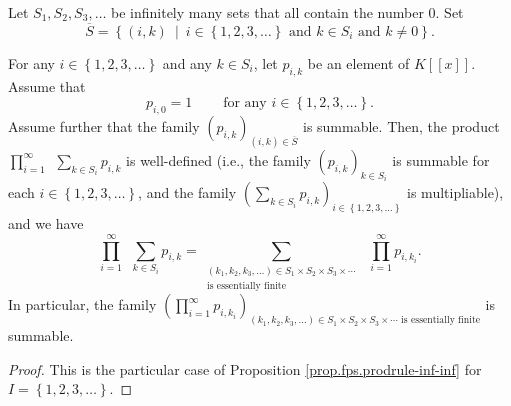 \begin{proposition}
\label{prop.fps.prodrule-inf-infN}
\leantarget
\leanok
Let $S_{1},S_{2},S_{3},\ldots$ be infinitely
many sets that all contain the number $0$. Set%
\[
\overline{S}=\left\{  \left(  i,k\right)  \ \mid\ i\in\left\{  1,2,3,\ldots
\right\}  \text{ and }k\in S_{i}\text{ and }k\neq0\right\}  .
\]

For any $i\in\left\{  1,2,3,\ldots\right\}  $ and any $k\in S_{i}$, let
$p_{i,k}$ be an element of $K\left[  \left[  x\right]  \right]  $. Assume
that
\begin{equation}
p_{i,0}=1\ \ \ \ \ \ \ \ \ \ \text{for any }i\in\left\{  1,2,3,\ldots\right\}
. \label{eq.prop.fps.prodrule-inf-infN.pi0=1}%
\end{equation}
Assume further that the family $\left(  p_{i,k}\right)  _{\left(  i,k\right)
\in\overline{S}}$ is summable. Then, the product $\prod_{i=1}^{\infty}%
\ \ \sum_{k\in S_{i}}p_{i,k}$ is well-defined (i.e., the family $\left(
p_{i,k}\right)  _{k\in S_{i}}$ is summable for each $i\in\left\{
1,2,3,\ldots\right\}  $, and the family $\left(  \sum_{k\in S_{i}}%
p_{i,k}\right)  _{i\in\left\{  1,2,3,\ldots\right\}  }$ is multipliable), and
we have%
\begin{equation}
\prod_{i=1}^{\infty}\ \ \sum_{k\in S_{i}}p_{i,k}=\sum_{\substack{\left(
k_{1},k_{2},k_{3},\ldots\right)  \in S_{1}\times S_{2}\times S_{3}\times
\cdots\\\text{is essentially finite}}}\ \ \prod_{i=1}^{\infty}p_{i,k_{i}}.
\label{eq.prop.fps.prodrule-inf-infN.eq}%
\end{equation}
In particular, the family $\left(  \prod_{i=1}^{\infty}p_{i,k_{i}}\right)
_{\left(  k_{1},k_{2},k_{3},\ldots\right)  \in S_{1}\times S_{2}\times
S_{3}\times\cdots\text{ is essentially finite}}$ is summable.
\end{proposition}

\begin{proof}
This is the particular case of Proposition \ref{prop.fps.prodrule-inf-inf}
for $I=\left\{  1,2,3,\ldots\right\}  $.
\end{proof}

